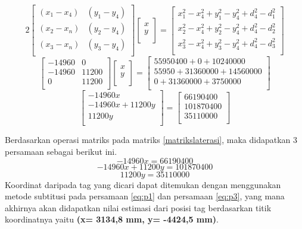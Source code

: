 \[ 
	2\begin{bmatrix}
	(x_{1}-x_{4})&(y_{1}-y_{4}) \\
	(x_{2}-x_{n})&(y_{2}-y_{4}) \\
	(x_{3}-x_{n})&(y_{3}-y_{4}) \\
	\end{bmatrix}
	\begin{bmatrix}
	x \\
	y \\
	\end{bmatrix}
	=\begin{bmatrix}
	x_1^2-x_4^2+y_1^2-y_4^2+d_4^2-d_1^2 \\
	x_2^2-x_4^2+y_2^2-y_4^2+d_4^2-d_2^2 \\
	x_3^2-x_4^2+y_3^2-y_4^2+d_4^2-d_3^2 \\	
	\end{bmatrix}
\]
\vspace{1ex}
\[
	\begin{bmatrix}
	-14960&0 \\
	-14960&11200 \\
	0&11200\\
	\end{bmatrix}
	\begin{bmatrix}
	x \\
	y \\
	\end{bmatrix}
	=\begin{bmatrix}
	55950400+0+10240000\\
	55950+31360000+14560000\\
	0+31360000+3750000\\
	\end{bmatrix}
\]
\vspace{1ex}
\[
\begin{bmatrix}
\label{matrikslaterasi}
-14960x \\
-14960x + 11200y \\
11200y\\
\end{bmatrix}
=\begin{bmatrix}
66190400\\
101870400\\
35110000\\
\end{bmatrix}
\]

Berdasarkan operasi matriks pada matriks \ref{matrikslaterasi}, maka didapatkan 3 persamaan sebagai berikut ini. 
\begin{equation}
\label{eq:p1}
-14960x = 66190400
\end{equation}
\begin{equation}
\label{eq:p2}
-14960x + 11200y = 101870400
\end{equation}
\begin{equation}
\label{eq:p3}
11200y = 35110000
\end{equation}
Koordinat daripada tag yang dicari dapat ditemukan dengan menggunakan metode subtitusi pada persamaan \ref{eq:p1} dan persamaan \ref{eq:p3}, yang mana akhirnya akan didapatkan nilai estimasi dari posisi tag berdasarkan titik koordinatnya yaitu \textbf{(x= 3134,8 mm, y= -4424,5 mm)}.
